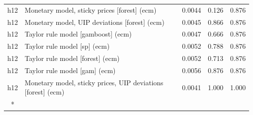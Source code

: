 \begin{ThreePartTable}
\begin{longtable}[t]{cp{5.5cm}ccc}
h12 & \raggedright Monetary model, sticky prices [forest] (ecm) & 0.0044 & 0.126 & 0.876\\
h12 & \raggedright Monetary model, UIP deviations [forest] (ecm) & 0.0045 & 0.866 & 0.876\\
h12 & \raggedright Taylor rule model [gamboost] (ecm) & 0.0047 & 0.666 & 0.876\\
h12 & \raggedright Taylor rule model [sp] (ecm) & 0.0052 & 0.788 & 0.876\\
h12 & \raggedright Taylor rule model [forest] (ecm) & 0.0052 & 0.713 & 0.876\\
h12 & \raggedright Taylor rule model [gam] (ecm) & 0.0056 & 0.876 & 0.876\\
h12 & \raggedright Monetary model, sticky prices, UIP deviations [forest] (ecm) & 0.0041 & 1.000 & 1.000\\*
\end{longtable}
\end{ThreePartTable}
\endgroup{}
